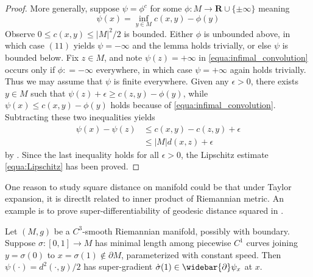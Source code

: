 \begin{proof}
	More generally, suppose \( \psi = \phi ^ { c } \) for some \( \phi : M \rightarrow \mathbf { R } \cup \{ \pm \infty \} \) meaning
	\begin{equation}
		\label{equa:infimal_convolution}
		\psi ( x ) = \inf _ { y \in M } c ( x , y ) - \phi ( y )
	\end{equation}
	Observe \( 0 \leq c ( x , y ) \leq | M | ^ { 2 } / 2 \) is bounded.
	Either \( \phi \) is unbounded above, in which case \( ( 11 ) \) yields \( \psi = - \infty \) and the lemma holds trivially, or else \( \psi \) is bounded below.
	Fix \( z \in M \), and note \( \psi ( z ) = + \infty \) in \cref{equa:infimal_convolution} occurs only if \( \phi : = - \infty \) everywhere, in which case \( \psi = + \infty \) again holds trivially.
	Thus we may assume that \( \psi \) is finite everywhere.
	Given any \( \epsilon > 0 \), there exists \( y \in M \)
	such that \( \psi ( z ) + \epsilon \geq c ( z , y ) - \phi ( y ) \), while \( \psi ( x ) \leq c ( x , y ) - \phi ( y ) \) holds because of \cref{equa:infimal_convolution}.
	Subtracting these two inequalities yields
	\begin{align*}
		\psi ( x ) - \psi ( z ) & \leq c ( x , y ) - c ( z , y ) + \epsilon \\
		                        & \leq | M | d ( x , z ) + \epsilon
	\end{align*}
	by . Since the last inequality holds for all \( \epsilon > 0 \), the Lipschitz
	estimate \cref{equa:Lipschitz} has been proved.
\end{proof}

One reason to study square distance on manifold could be that under Taylor expansion, it is directlt related to inner product of Riemannian metric.
An example is to prove super-differentiability of geodesic distance squared in \cite{mccann2001polar}.

\begin{prop}
	Let \( ( M , g ) \) be a \( C ^ { 3 } \)-smooth Riemannian manifold, possibly with boundary.
	Suppose \( \sigma : [ 0,1 ] \rightarrow M \) has minimal length among piecewise \( C ^ { 1 } \) curves joining \( y = \sigma ( 0 ) \) to \( x = \sigma ( 1 ) \notin \partial M \), parameterized with constant speed.
	Then \( \psi ( \cdot ) = d ^ { 2 } ( \cdot , y ) / 2 \) has super-gradient \( \dot { \sigma } ( 1 ) \in \widebar { \partial } \psi _ { x } \) at \( x \).
\end{prop}

